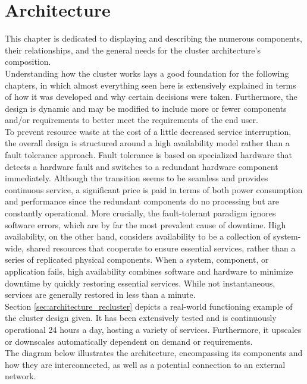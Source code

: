 \chapter{Architecture}
\label{cha:architecture}

This chapter is dedicated to displaying and describing the numerous components,
their relationships, and the general needs for the cluster architecture's composition.
\\ %
Understanding how the cluster works lays a good foundation for the following chapters,
in which almost everything seen here is extensively explained in terms of how it
was developed and why certain decisions were taken. Furthermore, the design is
dynamic and may be modified to include more or fewer components and/or
requirements to better meet the requirements of the end user. \\ %
To prevent resource waste at the cost of a little decreased service interruption,
the overall design is structured around a high availability model rather than a fault
tolerance approach. Fault tolerance is based on specialized hardware that
detects a hardware fault and switches to a redundant hardware component
immediately. Although the transition seems to be seamless and provides continuous
service, a significant price is paid in terms of both power consumption and
performance since the redundant components do no processing but are constantly
operational. More crucially, the fault-tolerant paradigm ignores software errors,
which are by far the most prevalent cause of downtime. High availability, on the
other hand, considers availability to be a collection of system-wide, shared resources
that cooperate to ensure essential services, rather than a series of replicated
physical components. When a system, component, or application fails, high
availability combines software and hardware to minimize downtime by quickly
restoring essential services. While not instantaneous, services are generally
restored in less than a minute\cite{high_availability_vs_fault_tolerance}. \\ %
Section \ref{sec:architecture_recluster} depicts a real-world functioning example
of the cluster design given. It has been extensively tested and is continuously
operational 24 hours a day, hosting a variety of services. Furthermore, it upscales
or downscales automatically dependent on demand or requirements. \\ %
The diagram below illustrates the architecture, encompassing its components and
how they are interconnected, as well as a potential connection to an external network.

